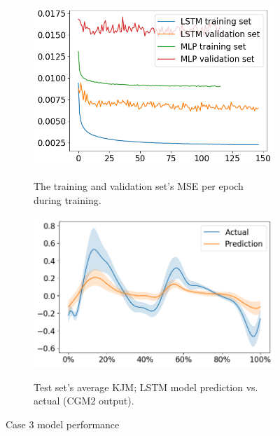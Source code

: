 \documentclass[../main.tex]{subfiles}
\begin{document}
\begin{figure}[!htb]
    \captionsetup[subfigure]{aboveskip=-12pt}
     \centering
     \begin{subfigure}[b]{0.475\textwidth}
         \centering
         \includegraphics[width=\textwidth]{img/results/training_history/Case3_LSTMvsMLP_training.png}
         \label{fig:case3-training-performance}
         \caption{The training and validation set's \ac{MSE} per epoch during training.}
     \end{subfigure}
     \hfill
     \begin{subfigure}[b]{0.515\textwidth}
         \centering
         \includegraphics[width=\textwidth]{img/results/test_prediction_evaluation/Case3_LSTM_test_prediction.png}
         \label{fig:case3-prediction-performance}
         \caption{Test set's average \ac{KJM}; LSTM model prediction vs. actual (CGM2 output).}
     \end{subfigure}
    \caption{Case 3 model performance}
    \label{fig:case3-performance-plots}
\end{figure}

\end{document}

